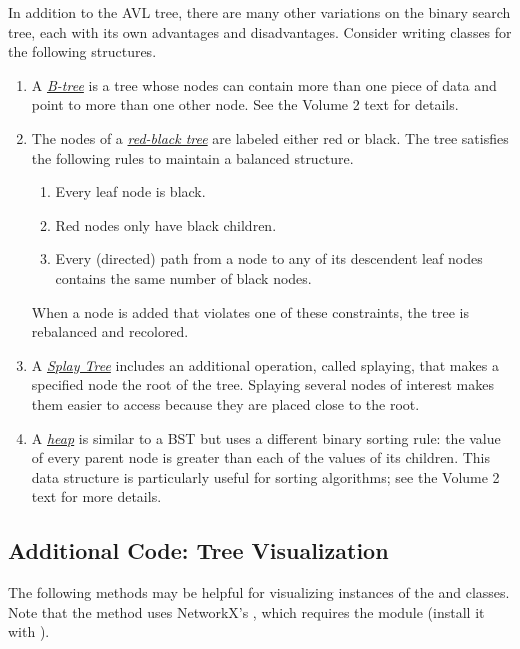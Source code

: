 In addition to the AVL tree, there are many other variations on the binary search tree, each with its own advantages and disadvantages.
Consider writing classes for the following structures.
%
\begin{enumerate}
\item A \href{https://en.wikipedia.org/wiki/B-tree}{\emph{B-tree}} is a tree whose nodes can contain more than one piece of data and point to more than one other node.
See the Volume 2 text for details.

\item The nodes of a \href{https://en.wikipedia.org/wiki/Red%E2%80%93black_tree}{\emph{red-black tree}} are labeled either red or black.
The tree satisfies the following rules to maintain a balanced structure.
%
\begin{enumerate}
    \item Every leaf node is black.
    \item Red nodes only have black children.
    \item Every (directed) path from a node to any of its descendent leaf nodes contains the same number of black nodes.
\end{enumerate}
%
When a node is added that violates one of these constraints, the tree is rebalanced and recolored.

\item A \href{https://en.wikipedia.org/wiki/Splay_tree}{\emph{Splay Tree}} includes an additional operation, called splaying, that makes a specified node the root of the tree.
Splaying several nodes of interest makes them easier to access because they are placed close to the root.

\item A \href{https://en.wikipedia.org/wiki/Heap_(data_structure)}{\emph{heap}} is similar to a BST but uses a different binary sorting rule: the value of every parent node is greater than each of the values of its children.
This data structure is particularly useful for sorting algorithms; see the Volume 2 text for more details.
\end{enumerate}

\subsection*{Additional Code: Tree Visualization} %

The following methods may be helpful for visualizing instances of the  and  classes.
Note that the  method uses NetworkX's , which requires the  module (install it with ).

